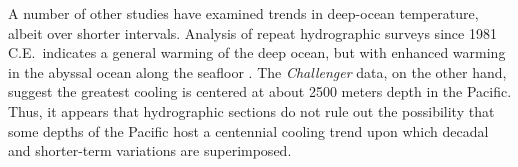\documentclass[authoryear,round,12pt]{article}
\begin{document}
A number of other studies have examined trends in deep-ocean
temperature, albeit over shorter intervals.  Analysis of repeat
hydrographic surveys since 1981 C.E.~indicates a general warming of
the deep ocean, but with enhanced warming in the abyssal ocean along
the seafloor
\citep{Purkey-Johnson-2010:Warming,Desbruy`e-Purkey-2016:Deep}. The
{\it Challenger} data, on the other hand, suggest the greatest cooling
is centered at about 2500 meters depth in the Pacific.  Thus, it
appears that hydrographic sections do not rule out the possibility
that some depths of the Pacific host a centennial cooling trend upon
which decadal and shorter-term variations are superimposed.









\end{document}
